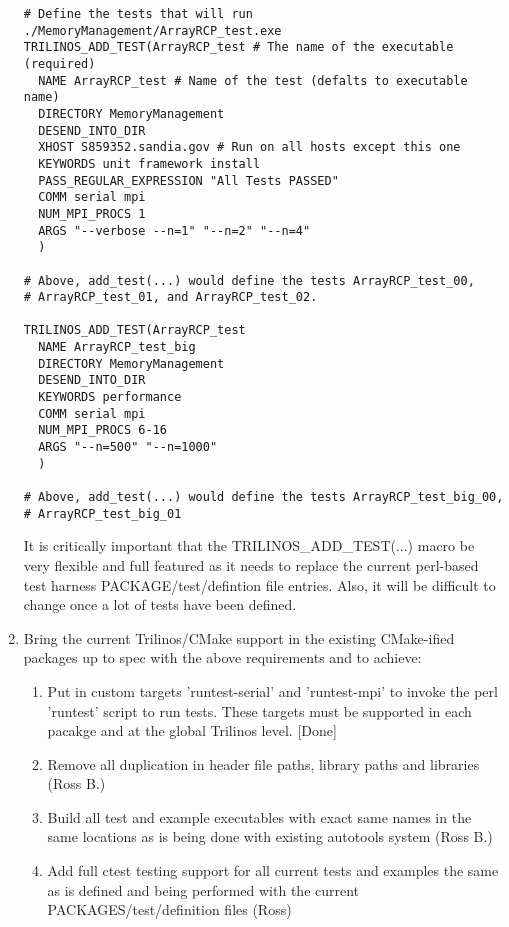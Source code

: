 \documentclass[pdf,ps2pdf,11pt]{SANDreport}
\begin{document}
\begin{enumerate}
\begin{verbatim}
# Define the tests that will run ./MemoryManagement/ArrayRCP_test.exe
TRILINOS_ADD_TEST(ArrayRCP_test # The name of the executable (required)
  NAME ArrayRCP_test # Name of the test (defalts to executable name)
  DIRECTORY MemoryManagement
  DESEND_INTO_DIR
  XHOST S859352.sandia.gov # Run on all hosts except this one
  KEYWORDS unit framework install
  PASS_REGULAR_EXPRESSION "All Tests PASSED"
  COMM serial mpi
  NUM_MPI_PROCS 1
  ARGS "--verbose --n=1" "--n=2" "--n=4"
  )

# Above, add_test(...) would define the tests ArrayRCP_test_00,
# ArrayRCP_test_01, and ArrayRCP_test_02.

TRILINOS_ADD_TEST(ArrayRCP_test
  NAME ArrayRCP_test_big
  DIRECTORY MemoryManagement
  DESEND_INTO_DIR
  KEYWORDS performance
  COMM serial mpi
  NUM_MPI_PROCS 6-16
  ARGS "--n=500" "--n=1000"
  )

# Above, add_test(...) would define the tests ArrayRCP_test_big_00,
# ArrayRCP_test_big_01

\end{verbatim}

It is critically important that the TRILINOS\_ADD\_TEST(...) macro be
very flexible and full featured as it needs to replace the current
perl-based test harness PACKAGE/test/defintion file entries.  Also, it
will be difficult to change once a lot of tests have been defined.

{}\item Bring the current Trilinos/CMake support in the existing
CMake-ified packages up to spec with the above requirements and to
achieve:

  \begin{enumerate}

  {}\item Put in custom targets 'runtest-serial' and 'runtest-mpi' to
  invoke the perl 'runtest' script to run tests.  These targets must
  be supported in each pacakge and at the global Trilinos level. [Done]

  {}\item Remove all duplication in header file paths, library paths
  and libraries (Ross B.)

  {}\item Build all test and example executables with exact same names
  in the same locations as is being done with existing autotools
  system (Ross B.)

  {}\item Add full ctest testing support for all current tests and
  examples the same as is defined and being performed with the current
  PACKAGES/test/definition files (Ross)


\end{enumerate}
\end{enumerate}
\end{document}

